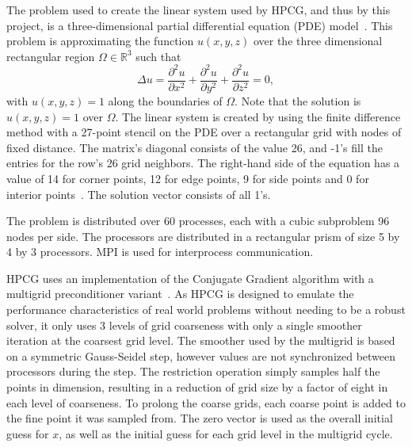 The problem used to create the linear system used by HPCG, and thus by this project, is a three-dimensional partial differential equation (PDE) model~\cite{Dongarra:2015:HPCG}.
This problem is approximating the function \(u(x, y, z)\) over the three dimensional rectangular region \(\Omega\in\mathbb{R}^3\) such that
\[
	\Delta u = \frac{\partial^2 u}{\partial x^2} + \frac{\partial^2 u}{\partial y^2} + \frac{\partial^2 u}{\partial z^2} = 0,
\] with \(u(x, y, z) = 1\) along the boundaries of \(\Omega\).
Note that the solution is \(u(x, y, z) = 1\) over \(\Omega\).
The linear system is created by using the finite difference method with a 27-point stencil on the PDE over a rectangular grid with nodes of fixed distance.
The matrix's diagonal consists of the value 26, and -1's fill the entries for the row's 26 grid neighbors.
The right-hand side of the equation has a value of 14 for corner points, 12 for edge points, 9 for side points and 0 for interior points~\cite{Kincaid:2009:Numerical}.
The solution vector consists of all 1's.

The problem is distributed over 60 processes, each with a cubic subproblem 96 nodes per side.
The processors are distributed in a rectangular prism of size 5 by 4 by 3 processors.
MPI is used for interprocess communication.

HPCG uses an implementation of the Conjugate Gradient algorithm with a multigrid preconditioner variant~\cite{Dongarra:2015:HPCG}.
As HPCG is designed to emulate the performance characteristics of real world problems without needing to be a robust solver, it only uses 3 levels of grid coarseness with only a single smoother iteration at the coarsest grid level.
The smoother used by the multigrid is based on a symmetric Gauss-Seidel step, however values are not synchronized between processors during the step.
The restriction operation simply samples half the points in dimension, resulting in a reduction of grid size by a factor of eight in each level of coarseness.
To prolong the coarse grids, each coarse point is added to the fine point it was sampled from.
The zero vector is used as the overall initial guess for \(x\), as well as the initial guess for each grid level in the multigrid cycle.

